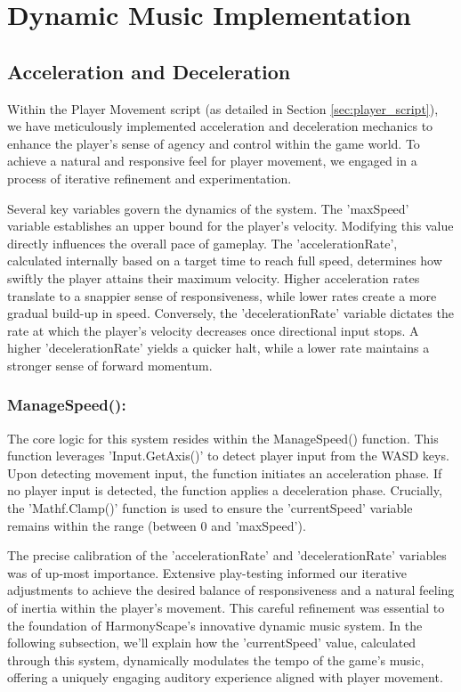 \documentclass{l4proj}
\begin{document}
\section{Dynamic Music Implementation}

\subsection{Acceleration and Deceleration}

Within the Player Movement script (as detailed in Section \ref{sec:player_script}), we have meticulously implemented acceleration and deceleration mechanics to enhance the player's sense of agency and control within the game world. To achieve a natural and responsive feel for player movement, we engaged in a process of iterative refinement and experimentation.
    
Several key variables govern the dynamics of the system. The 'maxSpeed' variable establishes an upper bound for the player's velocity. Modifying this value directly influences the overall pace of gameplay. The 'accelerationRate', calculated internally based on a target time to reach full speed, determines how swiftly the player attains their maximum velocity. Higher acceleration rates translate to a snappier sense of responsiveness, while lower rates create a more gradual build-up in speed. Conversely, the 'decelerationRate' variable dictates the rate at which the player's velocity decreases once directional input stops. A higher 'decelerationRate' yields a quicker halt, while a lower rate maintains a stronger sense of forward momentum.
    
\subsubsection{ManageSpeed():} The core logic for this system resides within the ManageSpeed() function. This function leverages 'Input.GetAxis()' to detect player input from the WASD keys. Upon detecting movement input, the function initiates an acceleration phase.  If no player input is detected, the function applies a deceleration phase. Crucially, the 'Mathf.Clamp()' function is used to ensure the 'currentSpeed' variable remains within the range (between 0 and 'maxSpeed').
    
The precise calibration of the 'accelerationRate' and 'decelerationRate' variables was of up-most importance. Extensive play-testing informed our iterative adjustments to achieve the desired balance of responsiveness and a natural feeling of inertia within the player's movement. This careful refinement was essential to the foundation of HarmonyScape's innovative dynamic music system. In the following subsection, we'll explain how the 'currentSpeed' value, calculated through this system, dynamically modulates the tempo of the game's music, offering a uniquely engaging auditory experience aligned with player movement.
\end{document}
